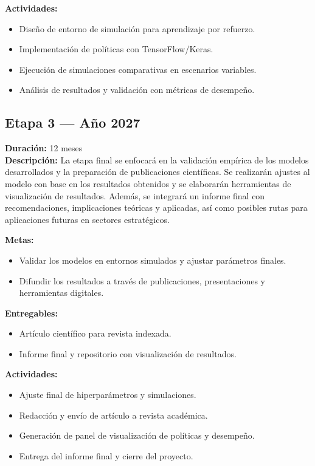 \documentclass[12pt]{article}
\begin{document}
\textbf{Actividades:}
\begin{itemize}
  \item Diseño de entorno de simulación para aprendizaje por refuerzo.
  \item Implementación de políticas con TensorFlow/Keras.
  \item Ejecución de simulaciones comparativas en escenarios variables.
  \item Análisis de resultados y validación con métricas de desempeño.
\end{itemize}

\subsection*{Etapa 3 — Año 2027}
\textbf{Duración:} 12 meses\\
\textbf{Descripción:} La etapa final se enfocará en la validación empírica de los modelos desarrollados y la preparación de publicaciones científicas. Se realizarán ajustes al modelo con base en los resultados obtenidos y se elaborarán herramientas de visualización de resultados. Además, se integrará un informe final con recomendaciones, implicaciones teóricas y aplicadas, así como posibles rutas para aplicaciones futuras en sectores estratégicos.

\textbf{Metas:}
\begin{itemize}
  \item Validar los modelos en entornos simulados y ajustar parámetros finales.
  \item Difundir los resultados a través de publicaciones, presentaciones y herramientas digitales.
\end{itemize}

\textbf{Entregables:}
\begin{itemize}
  \item Artículo científico para revista indexada.
  \item Informe final y repositorio con visualización de resultados.
\end{itemize}

\textbf{Actividades:}
\begin{itemize}
  \item Ajuste final de hiperparámetros y simulaciones.
  \item Redacción y envío de artículo a revista académica.
  \item Generación de panel de visualización de políticas y desempeño.
  \item Entrega del informe final y cierre del proyecto.
\end{itemize}
\end{document}
